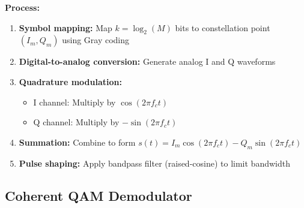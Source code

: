 \textbf{Process:}
\begin{enumerate}
\item \textbf{Symbol mapping:} Map $k = \log_2(M)$ bits to constellation point $(I_m, Q_m)$ using Gray coding
\item \textbf{Digital-to-analog conversion:} Generate analog I and Q waveforms
\item \textbf{Quadrature modulation:} 
  \begin{itemize}
  \item I channel: Multiply by $\cos(2\pi f_c t)$
  \item Q channel: Multiply by $-\sin(2\pi f_c t)$
  \end{itemize}
\item \textbf{Summation:} Combine to form $s(t) = I_m \cos(2\pi f_c t) - Q_m \sin(2\pi f_c t)$
\item \textbf{Pulse shaping:} Apply bandpass filter (raised-cosine) to limit bandwidth
\end{enumerate}

\subsection{Coherent QAM Demodulator}

